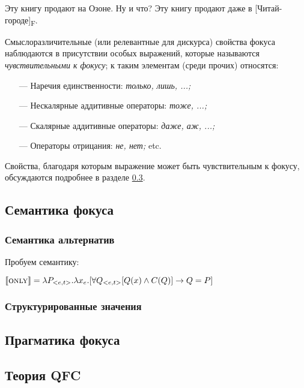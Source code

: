 \documentclass[a4paper, titlepage, 12pt]{article}
\begin{document}
\begin{exe}
    \ex \begin{xlist} \label{discourseSensitivity}
        \ex Эту книгу продают на Озоне.
        \ex Ну и что? Эту книгу продают даже в [Читай-городе]\textsubscript{F}.
    \end{xlist}
\end{exe}

Смыслоразличительные (или релевантные для дискурса) свойства фокуса наблюдаются в присутствии особых выражений, которые называются \textit{чувствительными к фокусу}; к таким элементам (среди прочих) относятся:

\begin{itemize}\setlength\itemsep{0em}
    \item[---] Наречия единственности: \textit{только,  лишь, ...;}
    \item[---] Нескалярные аддитивные операторы: \textit{тоже, ...;}
    \item[---] Скалярные аддитивные операторы: \textit{даже, аж, ...;}
    \item[---] Операторы отрицания: \textit{не, нет;} etc.
\end{itemize}

Свойства, благодаря которым выражение может быть чувствительным к фокусу, обсуждаются подробнее в разделе \ref{qfcTheory}.

\medskip

\subsection{Семантика фокуса}

\subsubsection{Семантика альтернатив \citep{rooth1985association,rooth1992theory}} \label{alternativeSemantics}

Пробуем семантику:

\begin{exe}
    \ex $ \llbracket \textsc{only} \rrbracket = \lambda P_{<e,t>}.\lambda x_{e}.[ \forall Q_{<e,t>} [Q(x) \land C(Q)] \rightarrow Q = P ]$
\end{exe}

\subsubsection{Структурированные значения \citep{Cresswell1985}} \label{structuredMeanings}

\subsection{Прагматика фокуса}

\subsection{Теория QFC \citep{beaver2008sense}} \label{qfcTheory}

\newpage
 

\end{document}
